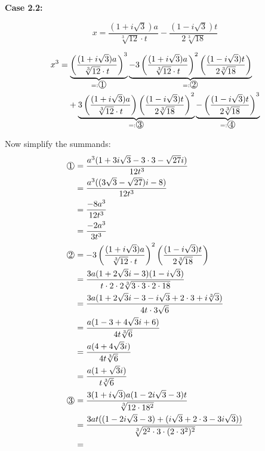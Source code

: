 \textbf{Case 2.2:}

\[x = \frac{(1+i \sqrt{3})a}{\sqrt[3]{12} \cdot t}
     -\frac{(1-i\sqrt{3}) t}{2\sqrt[3]{18}}\]

\begin{align}
    x^3 &= \underbrace{\left (\frac{(1+i\sqrt{3})a}{\sqrt[3]{12} \cdot t} \right)^3}_{=: \raisebox{.5pt}{\textcircled{\raisebox{-.9pt} {1}}}}
           \underbrace{- 3 \left(\frac{(1+i\sqrt{3})a}{\sqrt[3]{12} \cdot t} \right)^2 \left(\frac{(1-i\sqrt{3})t}{2 \sqrt[3]{18}} \right)}_{=: \raisebox{.5pt}{\textcircled{\raisebox{-.9pt} {2}}}}\\
         &\hphantom{{}=}+ \underbrace{3 \left(\frac{(1+i\sqrt{3})a}{\sqrt[3]{12} \cdot t} \right) \left(\frac{(1-i\sqrt{3})t}{2 \sqrt[3]{18}}\right)^2}_{=: \raisebox{.5pt}{\textcircled{\raisebox{-.9pt} {3}}}}
           \underbrace{- \left(\frac{(1-i\sqrt{3})t}{2 \sqrt[3]{18}}\right)^3}_{=: \raisebox{.5pt}{\textcircled{\raisebox{-.9pt} {4}}}}
\end{align}

Now simplify the summands:
\begin{align}
    \raisebox{.5pt}{\textcircled{\raisebox{-.9pt} {1}}} &=
    \frac{a^3(1+3i\sqrt{3} - 3 \cdot 3 - \sqrt{27} i)}{12 t^3}\\
    &= \frac{a^3((3\sqrt{3}- \sqrt{27})i - 8)}{12 t^3}\\
    &= \frac{-8a^3}{12 t^3}\\
    &= \frac{-2a^3}{3 t^3}\\
    \raisebox{.5pt}{\textcircled{\raisebox{-.9pt} {2}}} &=- 3 \left(\frac{(1+i\sqrt{3})a}{\sqrt[3]{12} \cdot t} \right)^2 \left(\frac{(1-i\sqrt{3})t}{2 \sqrt[3]{18}} \right)\\
    &= \frac{3a(1+2\sqrt{3}i-3)(1-i\sqrt{3})}{t \cdot 2 \cdot 2 \sqrt[3]{3 \cdot 3 \cdot 2 \cdot 18}}\\
    &= \frac{3a(1+2\sqrt{3}i - 3- i\sqrt{3}+2\cdot 3 + i\sqrt[3]{3})}{4t \cdot 3 \sqrt{6}}\\
    &= \frac{a(1-3+4\sqrt{3}i + 6)}{4t\sqrt[3]{6}}\\
    &= \frac{a(4+4\sqrt{3}i)}{4t \sqrt[3]{6}}\\
    &= \frac{a(1+\sqrt{3}i)}{t \sqrt[3]{6}}\\
    \raisebox{.5pt}{\textcircled{\raisebox{-.9pt} {3}}} &= \frac{3(1+i\sqrt{3})a (1-2i\sqrt{3} - 3)t}{\sqrt[3]{12 \cdot 18^2}}\\
    &= \frac{3at((1-2i\sqrt{3}-3)+(i\sqrt{3} + 2\cdot 3 - 3i\sqrt{3}))}{\sqrt[3]{2^2 \cdot 3 \cdot (2 \cdot 3^2)^2}}\\
    &=
\end{align}


